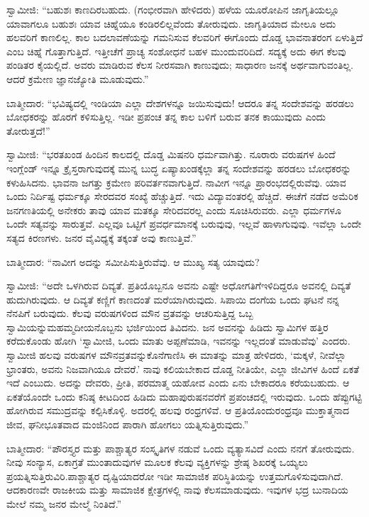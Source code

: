 ಸ್ವಾಮೀಜಿ: “ಬಹುಶಃ ಕಾಣದಿರಬಹುದು. (ಗಂಭೀರವಾಗಿ ಹೇಳಿದರು) ಹಳೆಯ ಯೂರೋಪಿನ ಜಾಗೃತಿಯಲ್ಲೂ ಯಾವಾಗಲೂ ಬಹುಶಃ ಯಾವ ಚಿಹ್ನೆಯೂ ಕಂಡಿರಲಿಲ್ಲ\-ವೆಂದು ತೋರುವುದು. ಜಾಗೃತಿಯಾದ ಮೇಲೂ ಅದು ಹಲವರಿಗೆ ಕಾಣಲಿಲ್ಲ. ಕಾಲ ಬದಲಾವಣೆಯನ್ನು ಗಮನಿಸುವ ಕೆಲವರಿಗೆ ಈಗೊಂದು ದೊಡ್ಡ ಭಾವನಾತರಂಗ ಏಳುತ್ತಿದೆ ಎಂಬ ಚಿಹ್ನೆ ಗೊತ್ತಾಗುತ್ತಿದೆ. ಇತ್ತೀಚೆಗೆ ಪ್ರಾಚ್ಯ ಸಂಶೋಧನೆ ಬಹಳ ಮುಂದುವರಿದಿದೆ. ಸದ್ಯಕ್ಕೆ ಅದು ಈಗ ಕೆಲವು ಪಂಡಿತರ ಕೈಯಲ್ಲಿದೆ. ಅವರು ಮಾಡಿರುವ ಕೆಲಸ ನೀರಸವಾಗಿ ಕಾಣುವುದು; ಸಾಧಾರಣ ಜನಕ್ಕೆ ಅರ್ಥವಾಗುವಂತಿಲ್ಲ. ಆದರೆ ಕ್ರಮೇಣ ಜ್ಞಾನಜ್ಯೋತಿ ಮೂಡುವುದು.”

ಬಾತ್ಮೀದಾರ: “ಭವಿಷ್ಯದಲ್ಲಿ ಇಂಡಿಯಾ ಎಲ್ಲಾ ದೇಶಗಳನ್ನೂ ಜಯಿಸುವುದು! ಆದರೂ ತನ್ನ ಸಂದೇಶವನ್ನು ಹರಡಲು ಬೋಧಕರನ್ನು ಹೊರಗೆ ಕಳಿಸುತ್ತಿಲ್ಲ. ಇಡೀ ಪ್ರಪಂಚ ತನ್ನ ಕಾಲ ಬಳಿಗೆ ಬರುವ ತನಕ ಕಾಯುವುದು ಎಂದು ತೋರುತ್ತದೆ!”

\eject

ಸ್ವಾಮೀಜಿ: “ಭರತಖಂಡ ಹಿಂದಿನ ಕಾಲದಲ್ಲಿ ದೊಡ್ಡ ಮಿಷನರಿ ಧರ್ಮವಾಗಿತ್ತು. ನೂರಾರು ವರುಷಗಳ ಹಿಂದೆ ಇಂಗ್ಲೆಂಡ್​ ಇನ್ನೂ ಕ್ರೈಸ್ತರಾಗುವುದಕ್ಕೆ ಮುನ್ನ ಬುದ್ಧ ಏಷ್ಯಾಖಂಡಕ್ಕೆಲ್ಲಾ ತನ್ನ ಸಂದೇಶವನ್ನು ಹರಡಲು ಬೋಧಕರನ್ನು ಕಳುಹಿಸಿದನು. ಭಾವನಾ ಜಗತ್ತು ಕ್ರಮೇಣ ಪರಿವರ್ತನವಾಗುತ್ತಿದೆ. ನಾವೀಗ ಇನ್ನೂ ಪ್ರಾರಂಭದಲ್ಲಿರುವೆವು. ಯಾವ ಒಂದು ನಿರ್ದಿಷ್ಟ ಧರ್ಮಕ್ಕೂ ಸೇರದವರ ಸಂಖ್ಯೆ ಹೆಚ್ಚುತ್ತಿದೆ. ಇದು ವಿದ್ಯಾವಂತರಲ್ಲಿ ಹೆಚ್ಚಿದೆ. ಈಚೆಗೆ ನಡೆದ ಅಮೆರಿಕ ಜನಗಣತಿಯಲ್ಲಿ ಅನೇಕರು ತಾವು ಯಾವ ಮತಕ್ಕೂ ಸೇರಿದವರಲ್ಲ ಎಂದು ಸೂಚಿಸಿರುವರು. ಎಲ್ಲಾ ಧರ್ಮಗಳೂ ಒಂದೇ ಸತ್ಯವನ್ನು ಸಾರುತ್ತವೆ. ಎಲ್ಲವೂ ಒಟ್ಟಿಗೆ ಪ್ರವರ್ಧಮಾನಕ್ಕೆ ಬರುವುವು, ಇಲ್ಲವೆ ಹಾಳಾಗುವುವು. ಇವೆಲ್ಲಾ ಒಂದೇ ಸತ್ಯದ ಕಿರಣಗಳು. ಜನರ ವೈವಿಧ್ಯಕ್ಕೆ ತಕ್ಕಂತೆ ಅವು ಕಾಣುತ್ತಿವೆ.”

ಬಾತ್ಮೀದಾರ: “ನಾವೀಗ ಅದನ್ನು ಸಮೀಪಿಸುತ್ತಿರುವೆವು. ಆ ಮುಖ್ಯ ಸತ್ಯ ಯಾವುದು?

ಸ್ವಾಮೀಜಿ: “ಅದೇ ಒಳಗಿರುವ ದಿವ್ಯತೆ. ಪ್ರತಿಯೊಬ್ಬನೂ ಅವನು ಎಷ್ಟೇ ಅಧೋಗತಿಗೆ\break ಇಳಿದಿದ್ದರೂ ಅವನಲ್ಲಿ ದಿವ್ಯತೆ ಹುದುಗಿರುವುದು. ಆ ದಿವ್ಯತೆ ಕಣ್ಣಿಗೆ ಕಾಣದಂತೆ ಮರೆಯಾಗಿರು\-ವುದು. ಸಿಪಾಯಿ ದಂಗೆಯ ಒಂದು ಘಟನೆ ನನ್ನ ನೆನಪಿಗೆ ಬರುವುದು. ಕೆಲವು ವರುಷಗಳಿಂದ ಮೌನ ವ್ರತವನ್ನು ಆಚರಿಸುತ್ತಿದ್ದ ಒಬ್ಬ ಸ್ವಾಮಿಯನ್ನು\break ಮಹಮ್ಮದೀಯನೊಬ್ಬನು ಭರ್ಜಿಯಿಂದ ತಿವಿದನು. ಜನ ಅವನನ್ನು ಹಿಡಿದು ಸ್ವಾಮಿಗಳ ಹತ್ತಿರ ಕರೆದುಕೊಂಡು ಹೋಗಿ ‘ಸ್ವಾಮೀಜಿ, ಒಂದು ಮಾತು ಅಪ್ಪಣೆಮಾಡಿ, ಇವನನ್ನು ಇಲ್ಲದಂತೆ ಮಾಡುವೆವು’ ಎಂದರು. ಸ್ವಾಮೀಜಿ ಹಲವು ವರುಷಗಳ ಮೌನವ್ರತವನ್ನು\break ಕೊನೆಗಾಣಿಸಿ ಈ ಮಾತನ್ನು ಮಾತ್ರ ಹೇಳಿದರು, ‘ಮಕ್ಕಳೆ, ನೀವೆಲ್ಲಾ ಭ್ರಾಂತರು, ಅವನು ನಿಜವಾಗಿಯೂ ದೇವರೆ.’ ನಾವು ಕಲಿಯಬೇಕಾದ ದೊಡ್ಡ ನೀತಿಯೇ, ಎಲ್ಲಾ ಜೀವಿಗಳ ಹಿಂದೆ ಏಕತೆ ಇದೆ ಎಂಬುದು. ಅದನ್ನು ದೇವರು, ಪ್ರೀತಿ, ಪರಮಾತ್ಮ ಯಹೋವ ಎಂದು ಏನು ಬೇಕಾದರೂ ಕರೆಯಬಹುದು. ಆ ಏಕತೆಯೊಂದೇ ಒಂದು ಕನಿಷ್ಠ ಕೀಟದಿಂದ ಹಿಡಿದು ಮಹಾಪುರುಷನವರೆಗೆ ಪ್ರಪಂಚದಲ್ಲಿ ಇರುವುದು. ಒಂದು ಹೆಪ್ಪುಗಟ್ಟಿ ಹೋಗಿ\-ರುವ ಸಮುದ್ರವನ್ನು ಕಲ್ಪಿಸಿಕೊಳ್ಳಿ. ಅದರಲ್ಲಿ ಹಲವು ರಂಧ್ರಗಳಿವೆ. ಆ ಪ್ರತಿಯೊಂದು\break ರಂಧ್ರವೂ ಮುಕ್ತಾತ್ಮನಾದ ಜೀವ, ಘನೀಭೂತವಾದ ಮಂಜಿನಿಂದ ಪಾರಾಗಿ ಹೋಗಲು ಯತ್ನಿಸುತ್ತಿರುವುದು.”

ಬಾತ್ಮೀದಾರ: “ಪೌರಸ್ತ್ಯರ ಮತ್ತು ಪಾಶ್ಚಾತ್ಯರ ಸಂಸ್ಕೃತಿಗಳ ನಡುವೆ ಒಂದು ವ್ಯತ್ಯಾಸವಿದೆ ಎಂದು ನನಗೆ ತೋರುವುದು. ನೀವು ಸಂನ್ಯಾಸ, ಏಕಾಗ್ರತೆ ಮುಂತಾದುವುಗಳ ಮೂಲಕ ಕೆಲವು ವ್ಯಕ್ತಿಗಳನ್ನು ಶ್ರೇಷ್ಠ ಶಿಖರಕ್ಕೆ ಒಯ್ಯಲು ಪ್ರಯತ್ನಿಸುತ್ತಿರುವಿರಿ.\break ಪಾಶ್ಚಾತ್ಯರ ದೃಷ್ಟಿಯಾದರೋ ಇಡೀ ಸಾಮಾಜಿಕ ಪರಿಸ್ಥಿತಿಯನ್ನು ಉತ್ತಮಗೊಳಿಸುವುದಾಗಿದೆ. ಆದಕಾರಣವೇ ರಾಜಕೀಯ ಮತ್ತು ಸಾಮಾಜಿಕ ಕ್ಷೇತ್ರಗಳಲ್ಲಿ ನಾವು ಕೆಲಸ\break ಮಾಡುವುದು. ಇವುಗಳ ಭದ್ರ ಬುನಾದಿಯ ಮೇಲೆ ನಮ್ಮ ಜನರ ಮೇಲ್ಮೆ ನಿಂತಿದೆ.”


